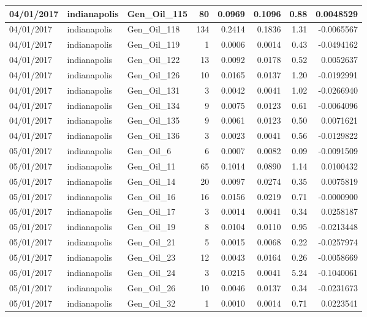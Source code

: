 \documentclass[
  letterpaper,
  DIV=11,
  numbers=noendperiod]{scrartcl}
\begin{document}
\begin{tabular}{l|l|l|r|r|r|r|r}
\hline
04/01/2017 & indianapolis & Gen\_Oil\_115 & 80 & 0.0969 & 0.1096 & 0.88 & 0.0048529\\
\hline
04/01/2017 & indianapolis & Gen\_Oil\_118 & 134 & 0.2414 & 0.1836 & 1.31 & -0.0065567\\
\hline
04/01/2017 & indianapolis & Gen\_Oil\_119 & 1 & 0.0006 & 0.0014 & 0.43 & -0.0494162\\
\hline
04/01/2017 & indianapolis & Gen\_Oil\_122 & 13 & 0.0092 & 0.0178 & 0.52 & 0.0052637\\
\hline
04/01/2017 & indianapolis & Gen\_Oil\_126 & 10 & 0.0165 & 0.0137 & 1.20 & -0.0192991\\
\hline
04/01/2017 & indianapolis & Gen\_Oil\_131 & 3 & 0.0042 & 0.0041 & 1.02 & -0.0266940\\
\hline
04/01/2017 & indianapolis & Gen\_Oil\_134 & 9 & 0.0075 & 0.0123 & 0.61 & -0.0064096\\
\hline
04/01/2017 & indianapolis & Gen\_Oil\_135 & 9 & 0.0061 & 0.0123 & 0.50 & 0.0071621\\
\hline
04/01/2017 & indianapolis & Gen\_Oil\_136 & 3 & 0.0023 & 0.0041 & 0.56 & -0.0129822\\
\hline
05/01/2017 & indianapolis & Gen\_Oil\_6 & 6 & 0.0007 & 0.0082 & 0.09 & -0.0091509\\
\hline
05/01/2017 & indianapolis & Gen\_Oil\_11 & 65 & 0.1014 & 0.0890 & 1.14 & 0.0100432\\
\hline
05/01/2017 & indianapolis & Gen\_Oil\_14 & 20 & 0.0097 & 0.0274 & 0.35 & 0.0075819\\
\hline
05/01/2017 & indianapolis & Gen\_Oil\_16 & 16 & 0.0156 & 0.0219 & 0.71 & -0.0000900\\
\hline
05/01/2017 & indianapolis & Gen\_Oil\_17 & 3 & 0.0014 & 0.0041 & 0.34 & 0.0258187\\
\hline
05/01/2017 & indianapolis & Gen\_Oil\_19 & 8 & 0.0104 & 0.0110 & 0.95 & -0.0213448\\
\hline
05/01/2017 & indianapolis & Gen\_Oil\_21 & 5 & 0.0015 & 0.0068 & 0.22 & -0.0257974\\
\hline
05/01/2017 & indianapolis & Gen\_Oil\_23 & 12 & 0.0043 & 0.0164 & 0.26 & -0.0058669\\
\hline
05/01/2017 & indianapolis & Gen\_Oil\_24 & 3 & 0.0215 & 0.0041 & 5.24 & -0.1040061\\
\hline
05/01/2017 & indianapolis & Gen\_Oil\_26 & 10 & 0.0046 & 0.0137 & 0.34 & -0.0231673\\
\hline
05/01/2017 & indianapolis & Gen\_Oil\_32 & 1 & 0.0010 & 0.0014 & 0.71 & 0.0223541\\

\end{tabular}
\end{document}

